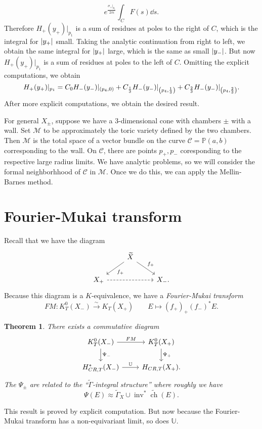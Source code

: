 \documentclass[leqno, openany]{memoir}
\newtheorem{thm}{Theorem}[section]
\theoremstyle{definition}
\theoremstyle{remark}
\theoremstyle{plain}
\theoremstyle{definition}
\theoremstyle{remark}
\renewcommand{\P}{\mathbb{P}}
\newcommand{\mc}[1]{\mathcal{#1}}
\newcommand{\on}[1]{\operatorname{#1}}
\newcommand{\wt}[1]{\widetilde{#1}}
\begin{document}
\[ e^{\frac{\sigma_+ |_{p_1}}{2 \pi i}} \int_C F(s) \dd{s}. \]
Therefore $H_+(y_+) |_{p_1}$ is a sum of residues at poles to the right of $C$, which is the integral for $\abs{y_+}$ small. Taking the analytic continuation from right to left, we obtain the same integral for $\abs{y_+}$ large, which is the same as small $\abs{y_-}$. But now $H_+(y_+) |_{p_1}$ is a sum of residues at poles to the left of $C$. Omitting the explicit computations, we obtain
\[ H_+(y_+)|_{p_1} = C_0 H_-(y_-)|_{(p_4, 0)} + C_{\frac{1}{3}} H_-(y_-)|_{\qty(p_4, \frac{1}{3})} + C_{\frac{2}{3}} H_-(y_-)|_{\qty(p_4, \frac{2}{3})}. \]
After more explicit computations, we obtain the desired result.

For general $X_{\pm}$, suppose we have a $3$-dimensional cone with chambers $\pm$ with a wall. Set $\mc{M}$ to be approximately the toric variety defined by the two chambers. Then $\mc{M}$ is the total space of a vector bundle on the curve $\mc{C} = \P(a,b)$ corresponding to the wall. On $\mc{C}$, there are points $p_+, p_-$ coresponding to the respective large radius limits. We have analytic problems, so we will consider the formal neighborhhood of $\mc{C}$ in $\mc{M}$. Once we do this, we can apply the Mellin-Barnes method.

\section{Fourier-Mukai transform}

Recall that we have the diagram
\begin{equation*}
\begin{tikzcd}
    & \wt{X} \ar{dl}{f_+} \ar{dr}{f_+} \\
    X_+ \ar[dashrightarrow]{rr} & & X_-.
\end{tikzcd}
\end{equation*}
Because this diagram is a $K$-equivalence, we have a \textit{Fourier-Mukai transform}
\[ FM \colon K_T^0(X_-) \xrightarrow{\sim} K_T(X_+) \qquad E \mapsto (f_+)_+ (f_-)^* E. \]
\begin{thm}
    There exists a commutative diagram
    \begin{equation*}
    \begin{tikzcd}
        K_T^0(X_-) \ar{r}{FM} \ar{d}{\Psi_-} & K_T^0(X_+) \ar{d}{\Psi_+} \\
        H^*_{CR,T}(X_-) \ar{r}{\mathbb{U}} & H_{CR,T}(X_+).
    \end{tikzcd}
    \end{equation*}
    The $\Psi_{\pm}$ are related to the ``$\wt{\Gamma}$-integral structure'' where roughly we have
    \[ \Psi(E) \approx \wt{\Gamma}_X \cup \on{inv}^* \wt{\on{ch}}(E). \]
\end{thm}
This result is proved by explicit computation. But now because the Fourier-Mukai transform has a non-equivariant limit, so does $\mathbb{U}$.
\end{document}
